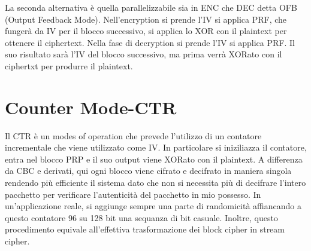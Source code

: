 \documentclass[a4paper,draft]{article}
\begin{document}
La seconda alternativa è quella parallelizzabile sia in ENC che DEC detta OFB (Output Feedback Mode). Nell'encryption si prende l'IV si applica PRF, che fungerà da IV per il blocco successivo, si applica lo XOR con il plaintext per ottenere il ciphertext. Nella fase di decryption si prende l'IV si applica PRF\@. Il suo risultato sarà l'IV del blocco successivo, ma prima verrà XORato con il ciphertxt per produrre il plaintext.
\section{Counter Mode-CTR}
Il CTR è un modes of operation che prevede l'utilizzo di un contatore incrementale che viene utilizzato come IV\@. In particolare si iniziliazza il contatore, entra nel blocco PRP e il suo output viene XORato con il plaintext\@. A differenza da CBC e derivati, qui ogni blocco viene cifrato e decifrato in maniera singola rendendo più efficiente il sistema dato che non si necessita più di decifrare l'intero pacchetto per verificare l'autenticità del pacchetto in mio possesso\@. \newline
In un'applicazione reale, si aggiunge sempre una parte di randomicità affiancando a questo contatore 96 su 128 bit una sequanza di bit casuale\@. Inoltre, questo procedimento equivale all'effettiva trasformazione dei block cipher in stream cipher\@.
\end{document}
